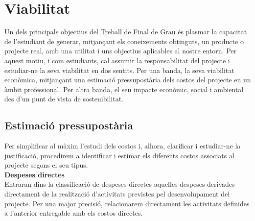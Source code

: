 \section{Viabilitat}

Un dels principals objectius del Treball de Final de Grau és plasmar la capacitat de l'estudiant de generar, mitjançant els coneixements obtinguts, un producte o projecte real, amb una utilitat i uns objectius aplicables al nostre entorn. Per aquest motiu, i com estudiants, cal assumir la responsabilitat del projecte i estudiar-ne la seva viabilitat en dos sentits. Per una banda, la seva viabilitat econòmica, mitjançant una estimació pressupostària dels costos del projecte en un àmbit professional. Per altra banda, el seu impacte econòmic, social i ambiental des d'un punt de vista de sostenibilitat.


\subsection{Estimació pressupostària}

Per simplificar al màxim l’estudi dels costos i, alhora, clarificar i estudiar-ne la justificació, procedirem a identificar i estimar els diferents costos associats al projecte segons el seu tipus.\\

\noindent \textbf{\large Despeses directes}\\

\noindent Entraran dins la classificació de despeses directes aquelles despeses derivades directament de la realització d’activitats previstes pel desenvolupament del projecte. Per una major precisió, relacionarem directament les activitats definides a l’anterior entregable amb els costos directes.  \\

